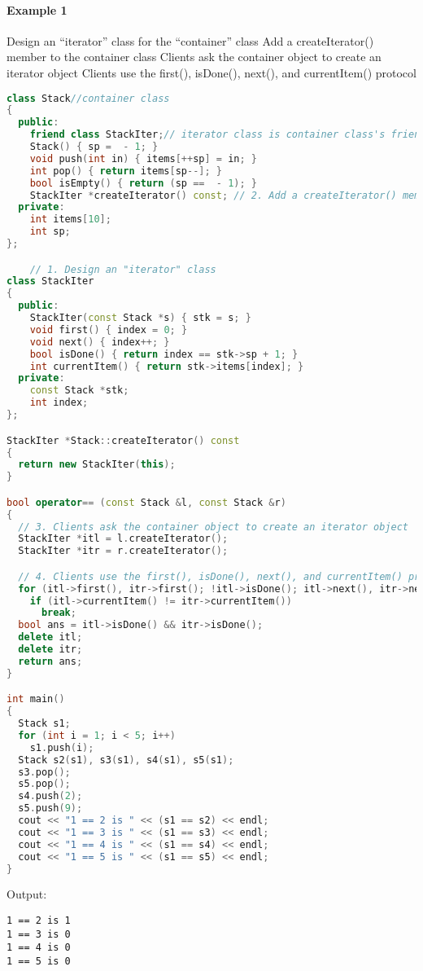 \documentclass{book}
\begin{document}
\paragraph{Example 1}
    Design an ``iterator'' class for the ``container'' class
    Add a createIterator() member to the container class
    Clients ask the container object to create an iterator object
    Clients use the first(), isDone(), next(), and currentItem() protocol
\begin{lstlisting}[caption={Iterator Pattern Example 1},language=C++]
class Stack//container class
{
  public:
    friend class StackIter;// iterator class is container class's friend
    Stack() { sp =  - 1; }
    void push(int in) { items[++sp] = in; }
    int pop() { return items[sp--]; }
    bool isEmpty() { return (sp ==  - 1); }
    StackIter *createIterator() const; // 2. Add a createIterator() member
  private:
    int items[10];
    int sp;
};

    // 1. Design an "iterator" class
class StackIter
{
  public:
    StackIter(const Stack *s) { stk = s; }
    void first() { index = 0; }
    void next() { index++; }
    bool isDone() { return index == stk->sp + 1; }
    int currentItem() { return stk->items[index]; }
  private:
    const Stack *stk;
    int index;
};

StackIter *Stack::createIterator() const
{
  return new StackIter(this);
}

bool operator== (const Stack &l, const Stack &r)
{
  // 3. Clients ask the container object to create an iterator object
  StackIter *itl = l.createIterator();
  StackIter *itr = r.createIterator();

  // 4. Clients use the first(), isDone(), next(), and currentItem() protocol
  for (itl->first(), itr->first(); !itl->isDone(); itl->next(), itr->next())
    if (itl->currentItem() != itr->currentItem())
      break;
  bool ans = itl->isDone() && itr->isDone();
  delete itl;
  delete itr;
  return ans;
}

int main()
{
  Stack s1;
  for (int i = 1; i < 5; i++)
    s1.push(i);
  Stack s2(s1), s3(s1), s4(s1), s5(s1);
  s3.pop();
  s5.pop();
  s4.push(2);
  s5.push(9);
  cout << "1 == 2 is " << (s1 == s2) << endl;
  cout << "1 == 3 is " << (s1 == s3) << endl;
  cout << "1 == 4 is " << (s1 == s4) << endl;
  cout << "1 == 5 is " << (s1 == s5) << endl;
}
\end{lstlisting}
Output:
\begin{verbatim}
1 == 2 is 1
1 == 3 is 0
1 == 4 is 0
1 == 5 is 0
\end{verbatim}
\end{document}
